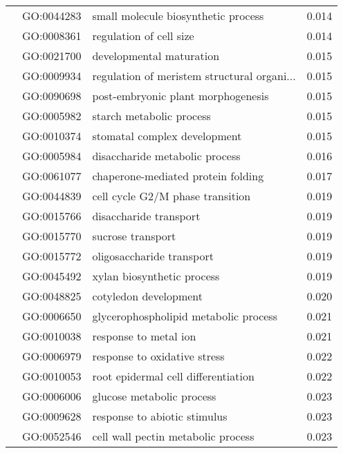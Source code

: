 \begin{longtable}{lllr}
   & GO:0044283 &          small molecule biosynthetic process &         0.014 \\
   & GO:0008361 &                      regulation of cell size &         0.014 \\
   & GO:0021700 &                     developmental maturation &         0.015 \\
   & GO:0009934 &  regulation of meristem structural organi... &         0.015 \\
   & GO:0090698 &           post-embryonic plant morphogenesis &         0.015 \\
   & GO:0005982 &                     starch metabolic process &         0.015 \\
   & GO:0010374 &                 stomatal complex development &         0.015 \\
   & GO:0005984 &               disaccharide metabolic process &         0.016 \\
   & GO:0061077 &           chaperone-mediated protein folding &         0.017 \\
   & GO:0044839 &             cell cycle G2/M phase transition &         0.019 \\
   & GO:0015766 &                       disaccharide transport &         0.019 \\
   & GO:0015770 &                            sucrose transport &         0.019 \\
   & GO:0015772 &                    oligosaccharide transport &         0.019 \\
   & GO:0045492 &                   xylan biosynthetic process &         0.019 \\
   & GO:0048825 &                        cotyledon development &         0.020 \\
   & GO:0006650 &        glycerophospholipid metabolic process &         0.021 \\
   & GO:0010038 &                        response to metal ion &         0.021 \\
   & GO:0006979 &                 response to oxidative stress &         0.022 \\
   & GO:0010053 &          root epidermal cell differentiation &         0.022 \\
   & GO:0006006 &                    glucose metabolic process &         0.023 \\
   & GO:0009628 &                 response to abiotic stimulus &         0.023 \\
   & GO:0052546 &           cell wall pectin metabolic process &         0.023 \\

\end{longtable}
